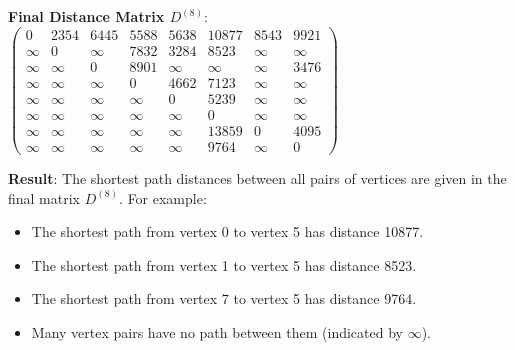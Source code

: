 \documentclass{article}
\theoremstyle{definition}
\begin{document}
\noindent\textbf{Final Distance Matrix $D^{(8)}$}:
$\begin{pmatrix}
0 & 2354 & 6445 & 5588 & 5638 & 10877 & 8543 & 9921 \\
\infty & 0 & \infty & 7832 & 3284 & 8523 & \infty & \infty \\
\infty & \infty & 0 & 8901 & \infty & \infty & \infty & 3476 \\
\infty & \infty & \infty & 0 & 4662 & 7123 & \infty & \infty \\
\infty & \infty & \infty & \infty & 0 & 5239 & \infty & \infty \\
\infty & \infty & \infty & \infty & \infty & 0 & \infty & \infty \\
\infty & \infty & \infty & \infty & \infty & 13859 & 0 & 4095 \\
\infty & \infty & \infty & \infty & \infty & 9764 & \infty & 0
\end{pmatrix}$

\noindent\textbf{Result}: The shortest path distances between all pairs of vertices are given in the final matrix $D^{(8)}$. For example:
\begin{itemize}
\item The shortest path from vertex 0 to vertex 5 has distance 10877.
\item The shortest path from vertex 1 to vertex 5 has distance 8523.
\item The shortest path from vertex 7 to vertex 5 has distance 9764.
\item Many vertex pairs have no path between them (indicated by $\infty$).
\end{itemize}
\end{document}

